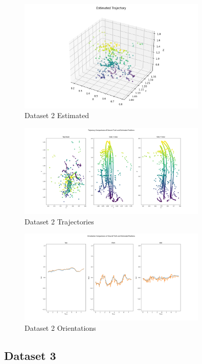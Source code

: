 \documentclass{article}
\begin{document}
\begin{figure}[H]
    \centering
    \includegraphics[width=0.8\textwidth]{./imgs/task1_2/studentdata2_estimated.png}
    \caption{Dataset 2 Estimated}
\end{figure}

\begin{figure}[H]
    \centering
    \includegraphics[width=0.8\textwidth]{./imgs/task1_2/studentdata2_trajectory_merged.png}
    \caption{Dataset 2 Trajectories}
\end{figure}

\begin{figure}[H]
    \centering
    \includegraphics[width=0.8\textwidth]{./imgs/task1_2/studentdata2_orientation_merged.png}
    \caption{Dataset 2 Orientations}
\end{figure}

\subsection*{Dataset 3}
\end{document}
